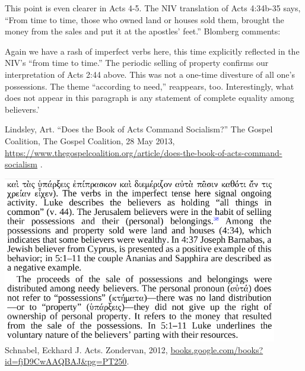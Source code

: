 \documentclass[11pt]{article}
\begin{document}
\begin{thebibliography}{37}
This point is even clearer in Acts 4-5. The NIV translation of Acts 4:34b-35 says, “From time to time, those who owned land or houses sold them, brought the money from the sales and put it at the apostles’ feet.” Blomberg comments:

Again we have a rash of imperfect verbs here, this time explicitly reflected in the NIV’s “from time to time.” The periodic selling of property confirms our interpretation of Acts 2:44 above. This was not a one-time divesture of all one’s possessions. The theme “according to need,” reappears, too. Interestingly, what does not appear in this paragraph is any statement of complete equality among believers.'

Lindsley, Art. “Does the Book of Acts Command Socialism?” The Gospel Coalition, The Gospel Coalition, 28 May 2013, \url{https://www.thegospelcoalition.org/article/does-the-book-of-acts-command-socialism} . 

\includegraphics[width=12cm]{eckhard_habit_selling_possessions}
Schnabel, Eckhard J. Acts. Zondervan, 2012, \url{books.google.com/books?id=fjD9CwAAQBAJ&pg=PT250}.


\end{thebibliography}
\end{document}
